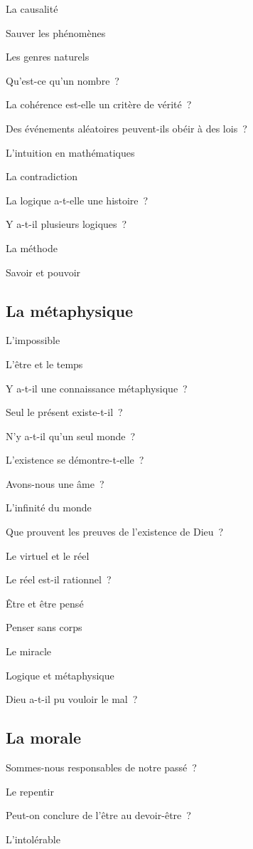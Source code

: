 \documentclass[a4paper]{article}
\begin{document}
La causalité

Sauver les phénomènes

Les genres naturels

Qu'est-ce qu'un nombre ?

La cohérence est-elle un critère de vérité ?

Des événements aléatoires peuvent-ils obéir à des lois ?

L'intuition en mathématiques

La contradiction

La logique a-t-elle une histoire ?

Y a-t-il plusieurs logiques ?

La méthode

Savoir et pouvoir

\subsection{La métaphysique}
\label{sec-6-3}

L'impossible

L'être et le temps

Y a-t-il une connaissance métaphysique ?

Seul le présent existe-t-il ?

N'y a-t-il qu'un seul monde ?

L'existence se démontre-t-elle ?

Avons-nous une âme ?

L'infinité du monde

Que prouvent les preuves de l'existence de Dieu ?

Le virtuel et le réel

Le réel est-il rationnel ?

Être et être pensé

Penser sans corps

Le miracle

Logique et métaphysique

Dieu a-t-il pu vouloir le mal ?

\subsection{La morale}
\label{sec-6-4}

Sommes-nous responsables de notre passé ?

Le repentir

Peut-on conclure de l'être au devoir-être ?

L'intolérable
\end{document}
